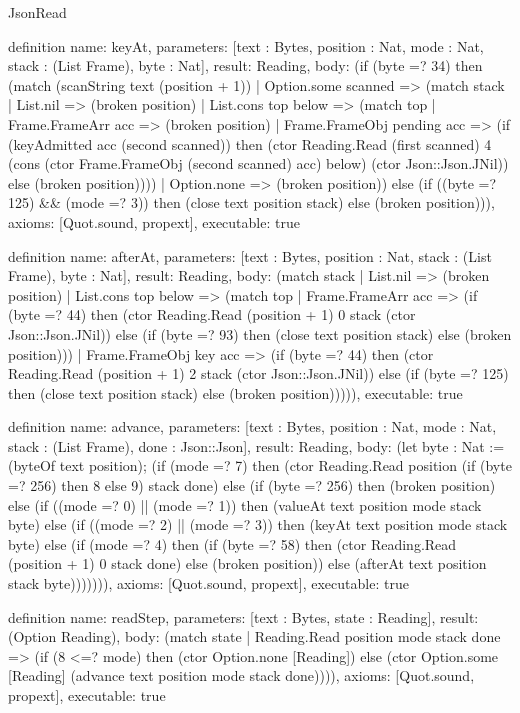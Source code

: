 \begin{lexlean}{JsonRead}
\begin{semanticmodule}
definition{
  name: keyAt,
  parameters: [text : Bytes, position : Nat, mode : Nat, stack : (List Frame), byte : Nat],
  result: Reading,
  body: (if (byte =? 34) then (match (scanString text (position + 1))
    | Option.some scanned => (match stack
      | List.nil => (broken position)
      | List.cons top below => (match top
        | Frame.FrameArr acc => (broken position)
        | Frame.FrameObj pending acc => (if (keyAdmitted acc (second scanned)) then (ctor Reading.Read (first scanned) 4 (cons (ctor Frame.FrameObj (second scanned) acc) below) (ctor Json::Json.JNil)) else (broken position))))
    | Option.none => (broken position)) else (if ((byte =? 125) && (mode =? 3)) then (close text position stack) else (broken position))),
  axioms: [Quot.sound, propext],
  executable: true
}

definition{
  name: afterAt,
  parameters: [text : Bytes, position : Nat, stack : (List Frame), byte : Nat],
  result: Reading,
  body: (match stack
    | List.nil => (broken position)
    | List.cons top below => (match top
      | Frame.FrameArr acc => (if (byte =? 44) then (ctor Reading.Read (position + 1) 0 stack (ctor Json::Json.JNil)) else (if (byte =? 93) then (close text position stack) else (broken position)))
      | Frame.FrameObj key acc => (if (byte =? 44) then (ctor Reading.Read (position + 1) 2 stack (ctor Json::Json.JNil)) else (if (byte =? 125) then (close text position stack) else (broken position))))),
  executable: true
}

definition{
  name: advance,
  parameters: [text : Bytes, position : Nat, mode : Nat, stack : (List Frame), done : Json::Json],
  result: Reading,
  body: (let byte : Nat := (byteOf text position); (if (mode =? 7) then (ctor Reading.Read position (if (byte =? 256) then 8 else 9) stack done) else (if (byte =? 256) then (broken position) else (if ((mode =? 0) || (mode =? 1)) then (valueAt text position mode stack byte) else (if ((mode =? 2) || (mode =? 3)) then (keyAt text position mode stack byte) else (if (mode =? 4) then (if (byte =? 58) then (ctor Reading.Read (position + 1) 0 stack done) else (broken position)) else (afterAt text position stack byte))))))),
  axioms: [Quot.sound, propext],
  executable: true
}

definition{
  name: readStep,
  parameters: [text : Bytes, state : Reading],
  result: (Option Reading),
  body: (match state
    | Reading.Read position mode stack done => (if (8 <=? mode) then (ctor Option.none [Reading]) else (ctor Option.some [Reading] (advance text position mode stack done)))),
  axioms: [Quot.sound, propext],
  executable: true
}


\end{semanticmodule}
\end{lexlean}
